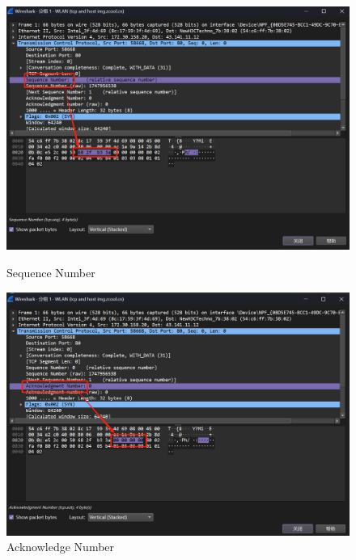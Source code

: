 \documentclass{article}
\begin{document}
	\begin{figure}[H]
		\centering
		\begin{minipage}[b]{0.45\textwidth}
			\includegraphics[width=\textwidth]{images/7.Sequence Number.png}
			\caption{Sequence Number}
		\end{minipage}
		\hfill
		\begin{minipage}[b]{0.45\textwidth}
			\includegraphics[width=\textwidth]{images/8.Acknowledge Number.png}
			\caption{Acknowledge Number}
		\end{minipage}
	\end{figure}
	
\end{document}
